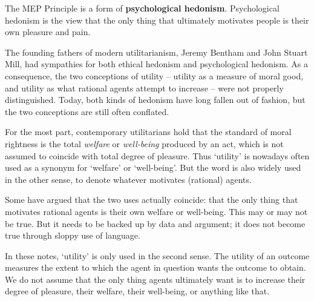 The MEP Principle is a form of \textbf{psychological
  hedonism}. Psychological hedonism is the view that the only thing
that ultimately motivates people is their own pleasure and pain.

The founding fathers of modern utilitarianism, Jeremy Bentham and John Stuart
Mill, had sympathies for both ethical hedonism and psychological hedonism. As a
consequence, the two conceptions of utility -- utility as a measure of moral
good, and utility as what rational agents attempt to increase -- were not
properly distinguished. Today, both kinds of hedonism have long fallen out of
fashion, but the two conceptions are still often conflated.


For the most part, contemporary utilitarians hold that the standard of moral
rightness is the total \emph{welfare} or \emph{well-being} produced by an act,
which is not assumed to coincide with total degree of pleasure. Thus `utility'
is nowadays often used as a synonym for `welfare' or `well-being'. But the word
is also widely used in the other sense, to denote whatever motivates (rational)
agents.

Some have argued that the two uses actually coincide: that the only
thing that motivates rational agents is their own welfare or
well-being. This may or may not be true. But it needs to be backed up
by data and argument; it does not become true through sloppy use of
language.

In these notes, `utility' is only used in the second sense. The utility of an
outcome measures the extent to which the agent in question wants the outcome to
obtain. We do not assume that the only thing agents ultimately want is to
increase their degree of pleasure, their welfare, their well-being, or anything
like that.


